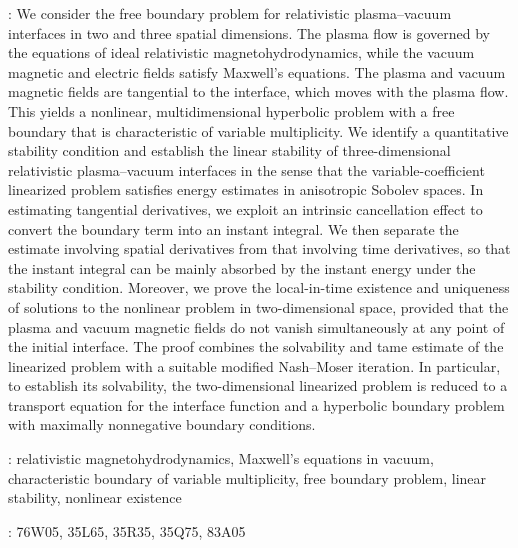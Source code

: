 \documentclass[twoside,11pt]{article}
\numberwithin{equation}{section}
\begin{document}
	{\small
		:\quad
We consider the free boundary problem for relativistic plasma--vacuum interfaces in two and three spatial dimensions. The plasma flow is governed by the equations of ideal relativistic magnetohydrodynamics, while the vacuum magnetic and electric fields satisfy Maxwell's equations.
The plasma and vacuum magnetic fields are tangential to the interface, which moves with the plasma flow.
This yields a nonlinear, multidimensional hyperbolic problem with a free boundary that is characteristic of variable multiplicity. We identify a quantitative stability condition and establish the linear stability of three-dimensional relativistic plasma--vacuum interfaces in the sense that the variable-coefficient linearized problem satisfies energy estimates in anisotropic Sobolev spaces.
In estimating tangential derivatives, we exploit an intrinsic cancellation effect to convert the boundary term into an instant integral.
We then separate the estimate involving spatial derivatives from that involving time derivatives,  so that the instant integral can be mainly absorbed by the instant energy under the stability condition.
Moreover, we prove the local-in-time existence and uniqueness of solutions to the nonlinear problem in two-dimensional space, provided that the plasma and vacuum magnetic fields do not vanish simultaneously at any point of the initial interface.
The proof combines the solvability and tame estimate of the linearized problem with a suitable modified Nash--Moser iteration.
In particular, to establish its solvability, the two-dimensional linearized problem is reduced to a transport equation for the interface function and a hyperbolic boundary problem with maximally nonnegative boundary conditions.


 
		
		\vspace{2mm}
		:\quad
		relativistic magnetohydrodynamics,
		Maxwell's equations in vacuum,
		characteristic boundary of variable multiplicity,
				free boundary problem,
		linear stability,
		nonlinear existence
		
		
		\vspace{1mm}
		:\quad
		76W05,
		35L65,
		35R35,
		35Q75,
		83A05
		
		
		\vspace{2mm}
		{\footnotesize \tableofcontents}
	}
	
\end{document}
